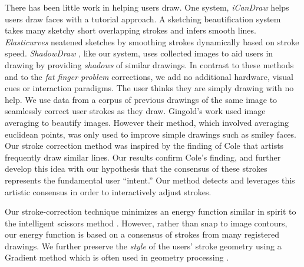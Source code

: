 There has been little work in helping users draw. One system, \emph{iCanDraw} \cite{Dixon:2010:IUS} helps users draw faces with a tutorial approach. A sketching beautification system~\cite{Orbay2011} takes many sketchy short overlapping strokes and infers smooth lines. \emph{Elasticurves} \cite{Thiel:2011} neatened sketches by smoothing strokes dynamically based on stroke speed.  \emph{ShadowDraw} \cite{Lee:2011}, like our system, uses collected images to aid users in drawing by providing {\em shadows} of similar drawings.  In contrast to these methods and to the \emph{fat finger problem} corrections, we add no additional hardware, visual cues or interaction paradigms. The user thinks they are simply drawing with no help. We use data from a corpus of previous drawings of the same image to seamlessly correct user strokes as they draw. Gingold's work used image averaging to beautify images. However their method, which involved averaging euclidean points, was only used to improve simple drawings such as smiley faces. Our stroke correction method was inspired by the finding of Cole \etal {} that artists frequently draw similar lines. Our results confirm Cole's finding, and further develop this idea with our hypothesis that the consensus of these strokes represents the fundamental user ``intent.'' Our method detects and leverages this artistic consensus in order to
interactively adjust strokes.

Our stroke-correction technique minimizes an energy function similar
in spirit to the intelligent scissors
method \cite{Mortensen:1995:ISF}. However, rather than snap to image
contours, our energy function is based on a consensus of strokes from many
registered drawings. We further preserve the {\em style} of the
users' stroke geometry using a Gradient method which is often used
in geometry processing \cite{Botsch:2008:LVS}. 